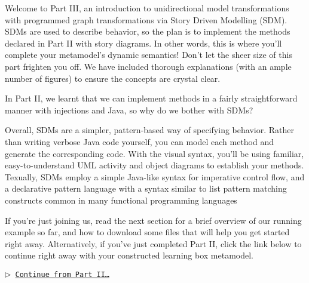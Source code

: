 \genHeader
{}

Welcome to Part III, an introduction to unidirectional model transformations with programmed graph transformations via Story Driven Modelling (SDM).
SDMs are used to describe behavior, so the plan is to implement the methods declared in Part II with story diagrams. In other words,
this is where you'll complete your metamodel's dynamic semantics! Don't let the sheer size of this part frighten you off. We have included thorough
explanations (with an ample number of figures) to ensure the concepts are crystal clear.

In Part II, we learnt that we can implement methods in a fairly straightforward manner with injections and Java, so why do we bother with SDMs?

Overall, SDMs are a simpler, pattern-based way of specifying behavior. Rather than writing verbose Java code yourself, you can model each method and generate
the corresponding code. With the visual syntax, you'll be using familiar, easy-to-understand UML activity and object diagrams to establish your methods.
Texually, SDMs employ a simple Java-like syntax for imperative control flow, and a declarative pattern language with a syntax similar to list pattern matching
constructs common in many functional programming languages

If you're just joining us, read the next section for a brief overview of our running example so far, and how to download some files that will help you get
started right away. Alternatively, if you've just completed Part II, click the link below to continue right away with your constructed learning box metamodel.

\begin{center}\texttt{$\triangleright$ \hyperlink{explanation}{Continue from Part II\ldots}}\end{center}
